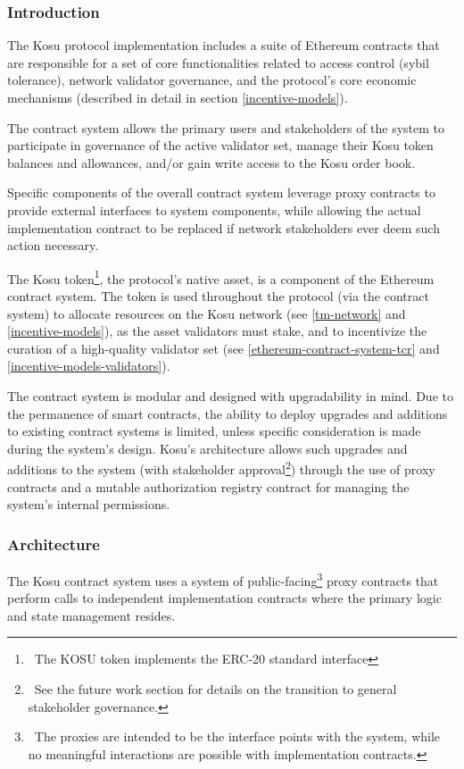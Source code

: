 \documentclass[10pt]{article}
\begin{document}
\subsubsection{Introduction}\label{ethereum-contract-system-intro}
The Kosu protocol implementation includes a suite of Ethereum contracts that are responsible for a set of core functionalities related to access control (sybil tolerance), network validator governance, and the protocol’s core economic mechanisms (described in detail in section \ref{incentive-models}).
\medskip

The contract system allows the primary users and stakeholders of the system to participate in governance of the active validator set, manage their Kosu token balances and allowances, and/or gain write access to the Kosu order book.
\medskip

Specific components of the overall contract system leverage proxy contracts to provide external interfaces to system components, while allowing the actual implementation contract to be replaced if network stakeholders ever deem such action necessary.
\medskip

The Kosu token\footnote{\ The KOSU token implements the ERC-20 standard interface\cite{erc-20}}, the protocol's native asset, is a component of the Ethereum contract system. The token is used throughout the protocol (via the contract system) to allocate resources on the Kosu network (see \ref{tm-network} and \ref{incentive-models}), as the asset validators must stake, and to incentivize the curation of a high-quality validator set (see \ref{ethereum-contract-system-tcr} and \ref{incentive-models-validators}).  
\medskip

The contract system is modular and designed with upgradability in mind. Due to the permanence of smart contracts, the ability to deploy upgrades and additions to existing contract systems is limited, unless specific consideration is made during the system’s design. Kosu’s architecture allows such upgrades and additions to the system (with stakeholder approval\footnote{\ See the future work section for details on the transition to general stakeholder governance.}) through the use of proxy contracts and a mutable authorization registry contract for managing the system’s internal permissions.

\subsubsection{Architecture}\label{ethereum-contract-system-architecture}
The Kosu contract system uses a system of public-facing\footnote{\ The proxies are intended to be the interface points with the system, while no meaningful interactions are possible with implementation contracts.} proxy contracts that perform calls to independent implementation contracts where the primary logic and state management resides.
\medskip
\end{document}
